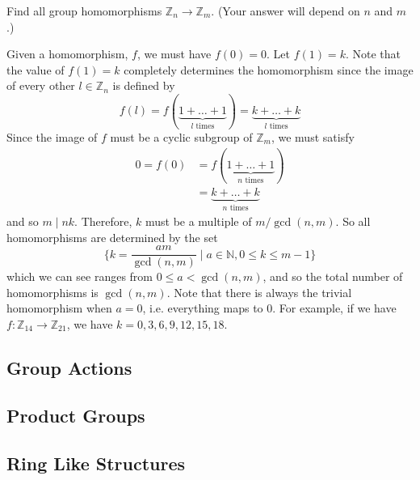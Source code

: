   \begin{exercise}[Assigned]
    Find all group homomorphisms $\mathbb{Z}_n \to \mathbb{Z}_m$. (Your answer will depend on $n$ and $m$.) 
  \end{exercise}
  \begin{solution}
    Given a homomorphism, $f$, we must have $f(0) = 0$. Let $f(1) = k$. Note that the value of $f(1) = k$ completely determines the homomorphism since the image of every other $l \in \mathbb{Z}_n$ is defined by 
    \begin{equation}
      f(l) = f(\underbrace{1 + \ldots + 1}_{l \text{ times}}) = \underbrace{k + \ldots + k}_{l \text{ times}}
    \end{equation}
    Since the image of $f$ must be a cyclic subgroup of $\mathbb{Z}_m$, we must satisfy 
    \begin{align}
      0 = f(0) & = f(\underbrace{1 + \ldots + 1}_{n \text{ times}}) \\
               & = \underbrace{k + \ldots + k}_{n \text{ times}} 
    \end{align}
    and so $m \mid nk$. Therefore, $k$ must be a multiple of $m/\gcd(n, m)$. So all homomorphisms are determined by the set 
    \begin{equation}
      \bigg\{ k = \frac{a m}{\gcd(n, m)} \; \bigg| \; a \in \mathbb{N}, 0 \leq k \leq m-1 \bigg\}
    \end{equation}
    which we can see ranges from $0 \leq a < \gcd(n, m)$, and so the total number of homomorphisms is $\gcd(n, m)$. Note that there is always the trivial homomorphism when $a = 0$, i.e. everything maps to $0$. For example, if we have $f: \mathbb{Z}_{14} \to \mathbb{Z}_{21}$, we have $k = 0, 3, 6, 9, 12, 15, 18$. 
  \end{solution}

\subsection{Group Actions}

\subsection{Product Groups}

\subsection{Ring Like Structures}

